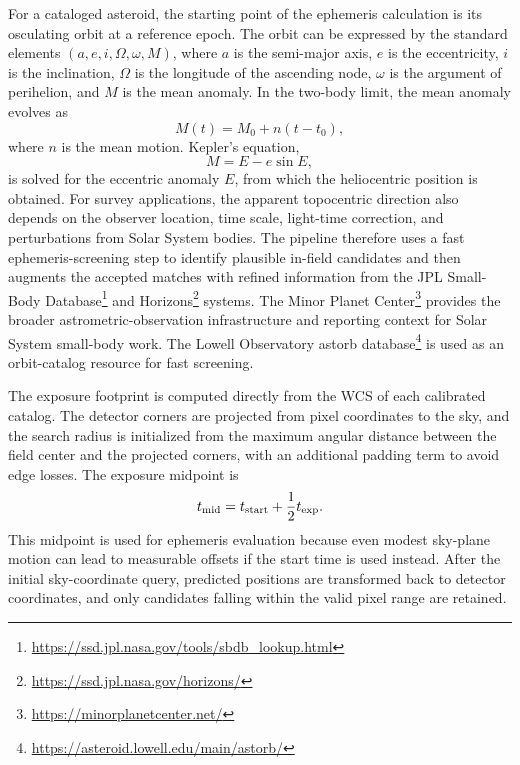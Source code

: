 \documentclass[referee]{raa}
\begin{document}
For a cataloged asteroid, the starting point of the ephemeris calculation is its osculating orbit at a reference epoch. The orbit can be expressed by the standard elements $(a,e,i,\Omega,\omega,M)$, where $a$ is the semi-major axis, $e$ is the eccentricity, $i$ is the inclination, $\Omega$ is the longitude of the ascending node, $\omega$ is the argument of perihelion, and $M$ is the mean anomaly. In the two-body limit, the mean anomaly evolves as
\begin{equation}
M(t)=M_0+n(t-t_0),
\end{equation}
where $n$ is the mean motion. Kepler's equation,
\begin{equation}
M=E-e\sin E,
\end{equation}
is solved for the eccentric anomaly $E$, from which the heliocentric position is obtained. For survey applications, the apparent topocentric direction also depends on the observer location, time scale, light-time correction, and perturbations from Solar System bodies. The pipeline therefore uses a fast ephemeris-screening step to identify plausible in-field candidates and then augments the accepted matches with refined information from the JPL Small-Body Database\footnote{\url{https://ssd.jpl.nasa.gov/tools/sbdb_lookup.html}} and Horizons\footnote{\url{https://ssd.jpl.nasa.gov/horizons/}} systems. The Minor Planet Center\footnote{\url{https://minorplanetcenter.net/}} provides the broader astrometric-observation infrastructure and reporting context for Solar System small-body work. The Lowell Observatory astorb database\footnote{\url{https://asteroid.lowell.edu/main/astorb/}} is used as an orbit-catalog resource for fast screening.

The exposure footprint is computed directly from the WCS of each calibrated catalog. The detector corners are projected from pixel coordinates to the sky, and the search radius is initialized from the maximum angular distance between the field center and the projected corners, with an additional padding term to avoid edge losses. The exposure midpoint is
\begin{equation}
t_{\rm mid}=t_{\rm start}+\frac{1}{2}t_{\rm exp}.
\end{equation}
This midpoint is used for ephemeris evaluation because even modest sky-plane motion can lead to measurable offsets if the start time is used instead. After the initial sky-coordinate query, predicted positions are transformed back to detector coordinates, and only candidates falling within the valid pixel range are retained.
\end{document}
